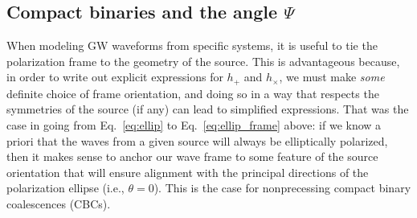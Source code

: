\documentclass[aps,prd,twocolumn,superscriptaddress,preprintnumbers,floatfix,nofootinbib]{revtex4-2}
\begin{document}
% 
% 

\subsection{Compact binaries and the angle $\Psi$}

When modeling GW waveforms from specific systems, it is useful to tie the polarization frame to the geometry of the source.
This is advantageous because, in order to write out explicit expressions for $h_+$ and $h_\times$, we must make \emph{some} definite choice of frame orientation, and doing so in a way that respects the symmetries of the source (if any) can lead to simplified expressions.
That was the case in going from Eq.~\eqref{eq:ellip} to Eq.~\eqref{eq:ellip_frame} above: if we know a priori that the waves from a given source will always be elliptically polarized, then it makes sense to anchor our wave frame to some feature of the source orientation that will ensure alignment with the principal directions of the polarization ellipse (i.e., $\theta=0$).
This is the case for nonprecessing compact binary coalescences (CBCs).
\end{document}
